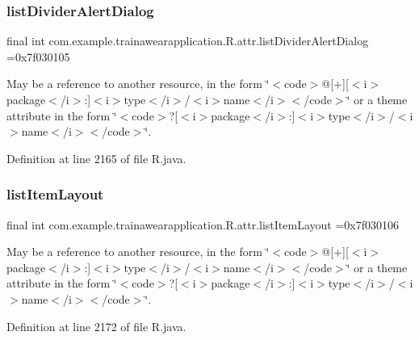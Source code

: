 \subsubsection{\texorpdfstring{listDividerAlertDialog}{listDividerAlertDialog}}
{\footnotesize\ttfamily final int com.\+example.\+trainawearapplication.\+R.\+attr.\+list\+Divider\+Alert\+Dialog =0x7f030105\hspace{0.3cm}{\ttfamily [static]}}

May be a reference to another resource, in the form \char`\"{}$<$code$>$@\mbox{[}+\mbox{]}\mbox{[}$<$i$>$package$<$/i$>$\+:\mbox{]}$<$i$>$type$<$/i$>$/$<$i$>$name$<$/i$>$$<$/code$>$\char`\"{} or a theme attribute in the form \char`\"{}$<$code$>$?\mbox{[}$<$i$>$package$<$/i$>$\+:\mbox{]}$<$i$>$type$<$/i$>$/$<$i$>$name$<$/i$>$$<$/code$>$\char`\"{}. 

Definition at line 2165 of file R.\+java.

\mbox{\label{classcom_1_1example_1_1trainawearapplication_1_1_r_1_1attr_a5186e88f3a8d2f47a984b3c4abdf950f}} 
\subsubsection{\texorpdfstring{listItemLayout}{listItemLayout}}
{\footnotesize\ttfamily final int com.\+example.\+trainawearapplication.\+R.\+attr.\+list\+Item\+Layout =0x7f030106\hspace{0.3cm}{\ttfamily [static]}}

May be a reference to another resource, in the form \char`\"{}$<$code$>$@\mbox{[}+\mbox{]}\mbox{[}$<$i$>$package$<$/i$>$\+:\mbox{]}$<$i$>$type$<$/i$>$/$<$i$>$name$<$/i$>$$<$/code$>$\char`\"{} or a theme attribute in the form \char`\"{}$<$code$>$?\mbox{[}$<$i$>$package$<$/i$>$\+:\mbox{]}$<$i$>$type$<$/i$>$/$<$i$>$name$<$/i$>$$<$/code$>$\char`\"{}. 

Definition at line 2172 of file R.\+java.

\mbox{\label{classcom_1_1example_1_1trainawearapplication_1_1_r_1_1attr_aa0da0cde08a5d41852489f527cc30824}} 
